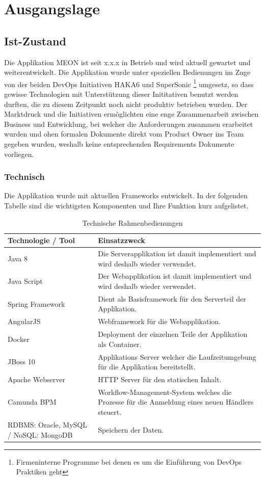 \graphicspath{{./images/}}

\chapter{Ausgangslage}

\section{Ist-Zustand}

Die Applikation MEON ist seit x.x.x in Betrieb und wird aktuell gewartet und weiterentwickelt. Die Applikation wurde unter speziellen Bedienungen im Zuge von der beiden DevOps Initiativen HAKA6 und SuperSonic \footnote{Firmeninterne Programme bei denen es um die Einführung von DevOps Praktiken geht} umgesetz, so dass gewisse Technologien mit Unterstützung dieser Inititativen benutzt werden durften, die zu diesem Zeitpunkt noch nicht produktiv betrieben wurden. Der Marktdruck und die Initiativen ermöglichten eine enge Zusammenarbeit zwischen Business und Entwicklung, bei welcher die Anforderungen zusammen erarbeitet wurden und ohen formalen Dokumente direkt vom Product Owner ins Team gegeben wurden, weshalb keine entsprechenden Requirements Dokumente vorliegen.

\subsection{Technisch}

Die Applikation wurde mit aktuellen Frameworks entwickelt. In der folgenden Tabelle sind die wichtigsten Komponenten und Ihre Funktion kurz aufgelistet.

\begin{table}[H]
	\centering
	\caption{Technische Rahmenbedienungen}
	\begin{tabular}{ | p{4cm} | p{12cm} | }
		\toprule
		{\textbf{Technologie / Tool}} & {\textbf{Einsatzzweck}} \\
		\midrule
		Java 8 & Die Serverapplikation ist damit implementiert und wird deshalb wieder verwendet. \\ \hline
		Java Script & Der Webapplikation ist damit implementiert und wird deshalb wieder verwendet. \\ \hline
		Spring Framework & Dient als Basisframework für den Serverteil der Applikation.  \\ \hline
		AngularJS & Webframework für die Webapplikation. \\ \hline
		Docker & Deployment der einzelnen Teile der Applikation als Container. \\ \hline
		JBoss 10 & Applikations Server welcher die Laufzeitumgebung für die Applikation bereitstellt. \\ \hline
		Apache Webserver & HTTP Server für den statischen Inhalt. \\ \hline
		Camunda BPM & Workflow-Management-System welches die Prozesse für die Anmeldung eines neuen Händlers steuert. \\ \hline
		RDBMS: Oracle, MySQL / NoSQL: MongoDB & Speichern der Daten. \\
		\bottomrule
	\end{tabular}
\end{table}

